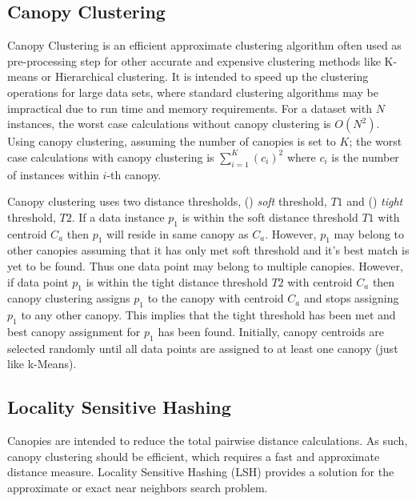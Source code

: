 \documentclass[10pt, conference, compsocconf]{IEEEtran}
\begin{document}
\subsection{\textbf{Canopy Clustering}}

Canopy Clustering \cite{MARCanopy} is an efficient 
approximate 
clustering algorithm often used as pre-processing step for other 
accurate and expensive clustering methods like  K-means or Hierarchical clustering. It
is intended to speed up the 
clustering operations for 
large data sets, where standard clustering algorithms may be 
impractical due to  run time and memory requirements. 
%
For a dataset with $N$ instances, the 
worst case calculations without canopy 
clustering is $O(N^2)$. Using canopy clustering, 
assuming the number of 
canopies is set to 
$K$; the 
worst case calculations with canopy clustering is $\sum_{i=1}^{K}(c_i)^2$ where $c_i$ is the number of instances within $i$-th canopy.


Canopy clustering uses two distance 
thresholds, () \textit{soft} threshold, $T1$ and () \textit{tight} threshold, $T2$. If a data instance 
$p_1$ is within the 
soft distance threshold $T1$ with centroid $C_a$ then $p_1$ will reside in same canopy as $C_a$. However,  $p_1$ may belong to other 
canopies assuming that it has only met soft threshold and it's 
best match is yet to be found. Thus one data point may belong to multiple canopies. However, 
if data point $p_1$ is within the tight distance threshold $T2$ with centroid $C_a$ then canopy clustering assigns $p_1$ to the  canopy with centroid $C_a$ 
  and stops 
  assigning $p_1$ to any other canopy. This implies that the
  tight threshold has been met and 
  best canopy assignment for $p_1$ has been found. Initially, canopy centroids are selected 
  randomly until all data points are
  assigned to at least one canopy (just like k-Means). 



\subsection{\textbf{Locality Sensitive Hashing}}

Canopies are intended to reduce the total pairwise distance calculations. As such, canopy clustering 
should be efficient, which requires a fast and approximate distance measure. Locality Sensitive Hashing (LSH) \cite{MARLshRef2} provides a solution 
for the approximate or exact near neighbors search problem. 
  
\end{document}

